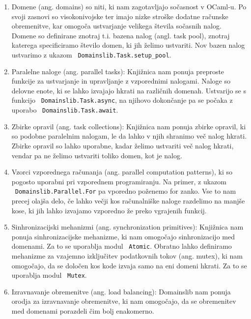 \documentclass[mat1, tisk]{fmfdelo}
\begin{document}
\begin{enumerate} \label{itemize:domainslib}
  \item Domene (ang. domains) so niti, ki nam zagotavljajo sočasnost v OCaml-u. 
        Po svoji zasnovi so visokonivojske ter imajo nizke stroške dodatne računske obremenitve, kar
        omogoča ustvarjanje velikega števila sočasnih nalog. Domene so definirane znotraj t.i. bazena nalog
        (angl. task pool), znotraj katerega specificiramo število domen, ki jih želimo ustvariti. Nov bazen
        nalog ustvarimo z ukazom ~\texttt{Domainslib.Task.setup\_pool}.
  \item Paralelne naloge (ang. parallel tasks): Knjižnica nam ponuja preproste funkcije za ustvarjanje in upravljanje
        z vzporednimi nalogami. Naloge so delovne enote, ki se lahko izvajajo hkrati na različnih domenah.
        Ustvarijo se s funkcijo ~\texttt{Domainslib.Task.async}, na njihovo dokončanje pa se počaka z uporabo
        ~\texttt{Domainslib.Task.await}.
  \item Zbirke opravil (ang. task collections): Knjižnica nam ponuja zbirke opravil, ki so podobne paralelnim nalogam, 
        le da lahko v njih shranimo več nalog hkrati. Zbirke opravil so lahko uporabne, kadar želimo ustvariti več nalog hkrati, 
        vendar pa ne želimo ustvariti toliko domen, kot je nalog.
  \item Vzorci vzporednega računanja (ang. parallel computation patterns), ki so pogosto uporabni pri vzporednem
        programiranju. Na primer, z ukazom ~\texttt{Domainslib.Parallel.For} pa vporedno poženemo for zanko.
        Vse to nam precej olajša delo, če lahko večji kos računalniške naloge razdelimo na manjše kose, ki jih lahko
        izvajamo vzporedno že preko vgrajenih funkcij.
  \item Sinhronizacijski mehanizmi (ang. synchronization primitives): Knjižnica nam ponuja sinhronizacijske mehanizme,
        ki nam omogočajo sinhronizacijo med domenami. Za to se uporablja modul ~\texttt{Atomic}. Obratno lahko definiramo
        mehanizme za vzajemno izključitev podatkovnih tokov (ang. mutex), ki nam omogočajo, da se določen kos kode
        izvaja samo na eni domeni hkrati. Za to se uporablja modul ~\texttt{Mutex}.
  \item Izravnavanje obremenitve (ang. load balancing): Domainslib nam ponuja orodja za izravnavanje obremenitve, 
        ki nam omogočajo, da se obremenitev med domenami porazdeli čim bolj enakomerno.
\end{enumerate}
\end{document}

